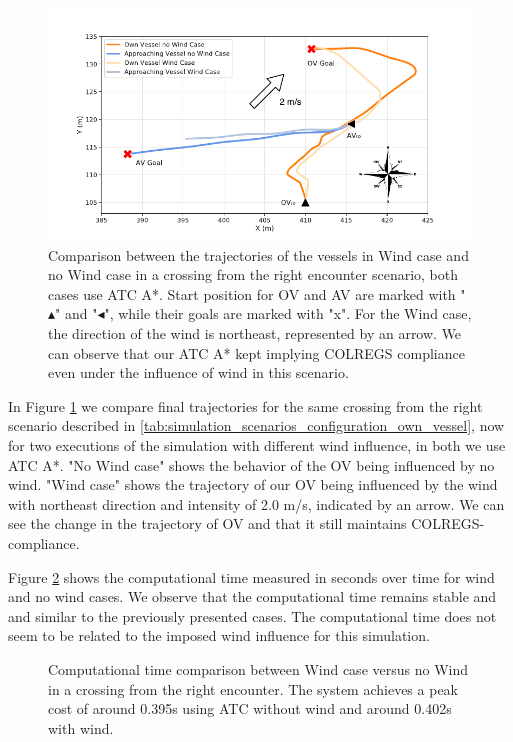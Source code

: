         \begin{figure}[H]
            \centering
            \includegraphics[width=\textwidth]{figs/Chap5/plot_cr_w_vs_wind.pdf}
            \caption{Comparison between the trajectories of the vessels in Wind case and no Wind case in a crossing from the right encounter scenario, both cases use \ac{ATC} A*. Start position for \ac{OV} and \ac{AV} are marked with "$\blacktriangle$" and "$\blacktriangleleft$", while their goals are marked with "x". For the Wind case, the direction of the wind is northeast, represented by an arrow. We can observe that our \ac{ATC} A* kept implying COLREGS compliance even under the influence of wind in this scenario.}
            \label{fig:plot_cr_w_vs_wind}
        \end{figure}
        
        In Figure \ref{fig:plot_cr_w_vs_wind} we compare final trajectories for the same crossing from the right scenario described in \ref{tab:simulation_scenarios_configuration_own_vessel}, now for two executions of the simulation with different wind influence, in both we use \ac{ATC} A*. "No Wind case" shows the behavior of the \ac{OV} being influenced by no wind. "Wind case" shows the trajectory of our \ac{OV} being influenced by the wind with northeast direction and intensity of 2.0 m/s, indicated by an arrow. We can see the change in the trajectory of \ac{OV} and that it still maintains \ac{COLREGS}-compliance. 
        
        Figure \ref{fig:plot_cr_w_vs_wind_CT} shows the computational time measured in seconds over time for wind and no wind cases. We observe that the computational time remains stable and and similar to the previously presented cases. The computational time does not seem to be related to the imposed wind influence for this simulation.
        \begin{figure}
            \centering
            
            \caption{Computational time comparison between Wind case versus no Wind in a crossing from the right encounter. The system achieves a peak cost of around 0.395s using \ac{ATC} without wind and around 0.402s with wind.}
            \label{fig:plot_cr_w_vs_wind_CT}
        \end{figure}
        
